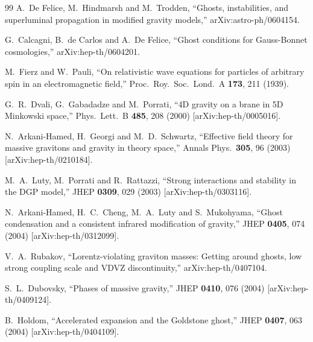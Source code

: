 \begin{thebibliography}{99}
  A.~De Felice, M.~Hindmarsh and M.~Trodden,
   ``Ghosts, instabilities, and superluminal propagation in modified gravity
  models,''
  arXiv:astro-ph/0604154.

  G.~Calcagni, B.~de Carlos and A.~De Felice,
  ``Ghost conditions for Gauss-Bonnet cosmologies,''
  arXiv:hep-th/0604201.

  M.~Fierz and W.~Pauli,
   ``On relativistic wave equations for particles of arbitrary spin in an
  electromagnetic field,''
  Proc.\ Roy.\ Soc.\ Lond.\ A {\bf 173}, 211 (1939).

  G.~R.~Dvali, G.~Gabadadze and M.~Porrati,
  ``4D gravity on a brane in 5D Minkowski space,''
  Phys.\ Lett.\ B {\bf 485}, 208 (2000)
  [arXiv:hep-th/0005016].

  N.~Arkani-Hamed, H.~Georgi and M.~D.~Schwartz,
  ``Effective field theory for massive gravitons and gravity in theory space,''
  Annals Phys.\  {\bf 305}, 96 (2003)
  [arXiv:hep-th/0210184].

  M.~A.~Luty, M.~Porrati and R.~Rattazzi,
  ``Strong interactions and stability in the DGP model,''
  JHEP {\bf 0309}, 029 (2003)
  [arXiv:hep-th/0303116].

N.~Arkani-Hamed, H.~C.~Cheng, M.~A.~Luty and S.~Mukohyama,
``Ghost condensation and a consistent infrared modification of gravity,''
JHEP {\bf 0405}, 074 (2004)
[arXiv:hep-th/0312099].

  V.~A.~Rubakov,
   ``Lorentz-violating graviton masses: Getting around ghosts, low strong
  coupling scale and VDVZ discontinuity,''
  arXiv:hep-th/0407104.

  S.~L.~Dubovsky,
  ``Phases of massive gravity,''
  JHEP {\bf 0410}, 076 (2004)
  [arXiv:hep-th/0409124].

  B.~Holdom,
  ``Accelerated expansion and the Goldstone ghost,''
  JHEP {\bf 0407}, 063 (2004)
  [arXiv:hep-th/0404109].


\end{thebibliography}
